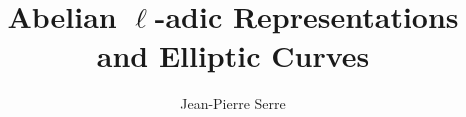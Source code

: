 \documentclass[12pt]{book}
\title{Abelian $\ell$-adic Representations and Elliptic Curves}
\author{Jean-Pierre Serre}
\begin{document}
\maketitle

\frontmatter
\tableofcontents

% 



\mainmatter








\nocite{*}
\printbibliography
\printindex
\end{document}
